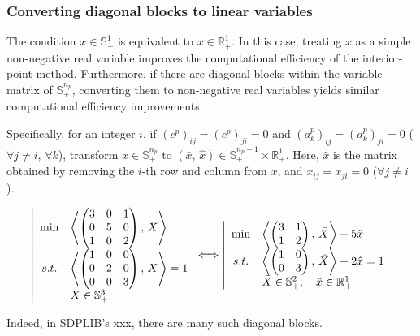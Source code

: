 \subsubsection{Converting diagonal blocks to linear variables}
The condition $x\in \mathbb{S}^1_+$ is equivalent to $x\in \mathbb{R}^1_+$.
In this case, treating $x$ as a simple non-negative real variable improves the computational efficiency of the interior-point method.
Furthermore, if there are diagonal blocks within the variable matrix of $\mathbb{S}^{n_p}_+$, converting them to non-negative real variables yields similar computational efficiency improvements.

Specifically, for an integer $i$,
if $(c^p)_{ij}=(c^p)_{ji}=0$ and $(a^p_k)_{ij}=(a^p_k)_{ji}=0$ 
($\forall j\neq i,\,\forall k$),
transform $x\in \mathbb{S}^{n_p}_+$ to $(\bar{x},\,\hat{x})\in \mathbb{S}^{n_p-1}_+\times \mathbb{R}^1_+$.
Here, $\bar{x}$ is the matrix obtained by removing the $i$-th row and column from $x$, and $x_{ij}= x_{ji}=0$ ($\forall j\neq i$).

\begin{example}
\begin{equation*}
    \left|
    \begin{array}{cl}
        \min & \left\langle \begin{pmatrix}
            3 & 0 & 1 \\
            0 & 5 & 0 \\
            1 & 0 & 2
        \end{pmatrix}, \, X \right\rangle \\
        s.t. 
        & \left\langle \begin{pmatrix}
            1 & 0 & 0 \\ 
            0 & 2 & 0 \\ 
            0 & 0 & 3
        \end{pmatrix}, \, X \right\rangle = 1 \\
        & X\in \mathbb{S}^3_+ 
    \end{array}
    \right.
    \Longleftrightarrow
    \left|
    \begin{array}{cl}
        \min & \left\langle \begin{pmatrix}
            3 & 1 \\
            1 & 2
        \end{pmatrix}, \, \bar{X} \right\rangle + 5\hat{x} \\
        s.t. 
        & \left\langle \begin{pmatrix}
            1 & 0 \\ 0 & 3
        \end{pmatrix}, \, \bar{X} \right\rangle + 2\hat{x} = 1 \\
        & \bar{X}\in \mathbb{S}^2_+, \quad \hat{x} \in \mathbb{R}^1_+
    \end{array}
    \right.
\end{equation*}
\end{example}
Indeed, in SDPLIB's xxx, there are many such diagonal blocks.

